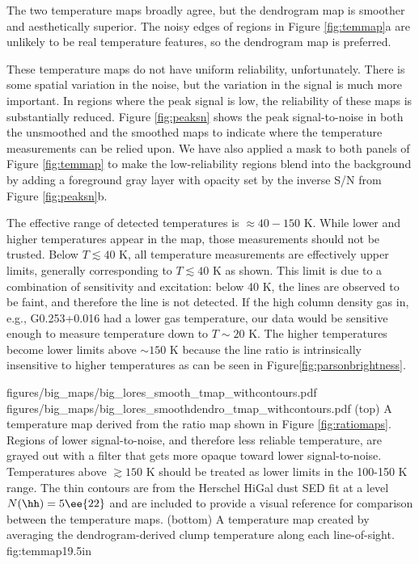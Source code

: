 The two temperature maps broadly agree, but the dendrogram map is smoother and
aesthetically superior.  The noisy edges of regions in Figure \ref{fig:temmap}a
are unlikely to be real temperature features, so the dendrogram map is
preferred.

These temperature maps do not have uniform reliability, unfortunately.  There
is some spatial variation in the noise, but the variation in the signal is much
more important.  In regions where the peak signal is low, the reliability of
these maps is substantially reduced.  Figure \ref{fig:peaksn} shows the peak
signal-to-noise in both the unsmoothed and the smoothed maps to indicate where
the temperature measurements can be relied upon.  We have also applied a mask
to both panels of Figure \ref{fig:temmap} to make the low-reliability regions
blend into the background by adding a foreground gray layer with opacity set by
the inverse S/N from Figure \ref{fig:peaksn}b.

The effective range of detected temperatures is $\approx40-150$ K. While lower
and higher temperatures appear in the map, those measurements should not be
trusted.  Below $T\lesssim40$ K, all temperature measurements are effectively
upper limits, generally corresponding to $T\lesssim40$ K as shown.  This limit
is due to a combination of sensitivity and excitation: below 40 K, the \para
lines are observed to be faint, and therefore the \threetwoone line is not
detected.  If the high column density gas in, e.g., G0.253+0.016 had a lower
gas temperature, our data would be sensitive enough to measure temperature down
to $T\sim20$ K.  The higher temperatures become lower limits above $\sim150$ K
because the \para line ratio is intrinsically insensitive to higher
temperatures as can be seen in Figure\ref{fig:parsonbrightness}.

\RotFigureTwoAA
{figures/big_maps/big_lores_smooth_tmap_withcontours.pdf}
{figures/big_maps/big_lores_smoothdendro_tmap_withcontours.pdf}
{(top) A temperature map derived from the \Rone ratio map shown
in Figure \ref{fig:ratiomaps}.  Regions of lower signal-to-noise, and therefore less
reliable temperature, are grayed out with a filter that gets more opaque
toward lower signal-to-noise.  Temperatures above $\gtrsim150$ K should be
treated as lower limits in the 100-150 K range.
The thin contours are from the Herschel HiGal dust SED fit at a level $N(\hh)=5\ee{22}$
and are included to provide a visual reference for comparison between the temperature
maps.
(bottom) A temperature map created by averaging the dendrogram-derived clump temperature
along each line-of-sight.
}
{fig:temmap}{1}{9.5in}


